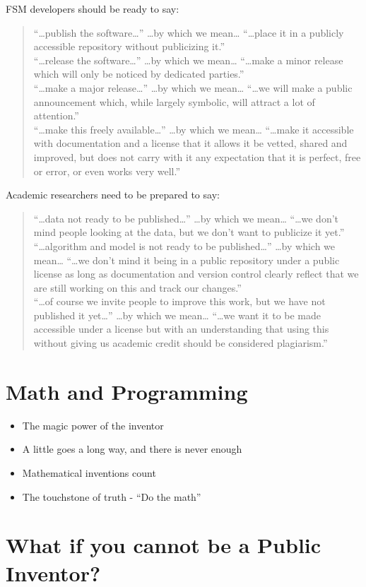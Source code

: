 \documentclass[
	fontsize=10pt, %
	twoside=false, %
	secnumdepth=1, %
]{kaobook}
\begin{document}
FSM developers should be ready to say:
\blockquote{
“…publish the software…” …by which we mean… “…place it in a publicly accessible repository without publicizing it.” \\
“…release the software…” …by which we mean… “…make a minor release which will only be noticed by dedicated parties.” \\
“…make a major release…” …by which we mean… “…we will make a public announcement which, while largely symbolic, will attract a lot of attention.” \\
“…make this freely available…” …by which we mean… “…make it accessible with documentation and a license that it allows it be vetted, shared and improved, but does not carry with it any expectation that it is perfect, free or error, or even works very well.”
}
Academic researchers need to be prepared to say:
\blockquote{
“…data not ready to be published…” …by which we mean… “…we don’t mind people looking at the data, but we don’t want to publicize it yet.” \\
“…algorithm and model is not ready to be published…” …by which we mean… “…we don’t mind it being in a public repository under a public license as long as documentation and version control clearly reflect that we are still working on this and track our changes.” \\
  “…of course we invite people to improve this work, but we have not published it yet…” …by which we mean… “…we want it to be made accessible under a license but with an understanding that using this without giving us academic credit should be considered plagiarism.” \\
  }

\chapter{Math and Programming}

\begin{itemize}
\item The magic power of the inventor
\item A little goes a long way, and there is never enough
\item Mathematical inventions count
  \item The touchstone of truth - ``Do the math''
\end{itemize}

\chapter{What if you cannot be a Public Inventor?}
\end{document}

